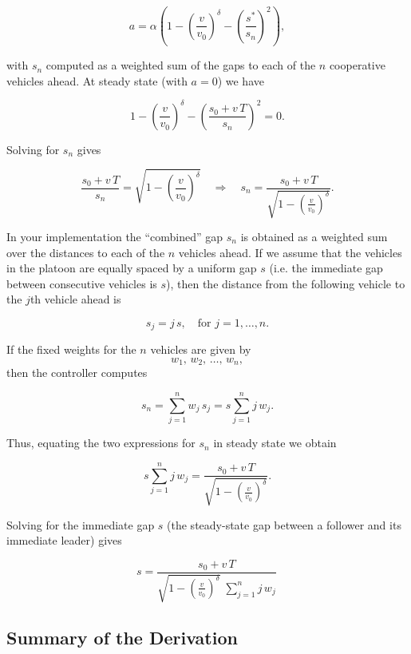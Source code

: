 \documentclass{article}
\begin{document}
\[
a = \alpha\left(1 - \left(\frac{v}{v_0}\right)^\delta - \left(\frac{s^*}{s_n}\right)^2\right),
\]

with \(s_n\) computed as a weighted sum of the gaps to each of the \(n\) cooperative vehicles ahead. At steady state (with \(a=0\)) we have

\[
1 - \left(\frac{v}{v_0}\right)^\delta - \left(\frac{s_0+v\,T}{s_n}\right)^2 = 0.
\]

Solving for \(s_n\) gives

\[
\frac{s_0+v\,T}{s_n} = \sqrt{1 - \left(\frac{v}{v_0}\right)^\delta}
\quad\Longrightarrow\quad
s_n = \frac{s_0+v\,T}{\sqrt{1 - \left(\frac{v}{v_0}\right)^\delta}}.
\]

In your implementation the ``combined'' gap \(s_n\) is obtained as a weighted sum over the distances to each of the \(n\) vehicles ahead. If we assume that the vehicles in the platoon are equally spaced by a uniform gap \(s\) (i.e. the immediate gap between consecutive vehicles is \(s\)), then the distance from the following vehicle to the \(j\)th vehicle ahead is

\[
s_j = j\,s,\quad \text{for } j=1,\ldots,n.
\]

If the fixed weights for the \(n\) vehicles are given by
\[
w_1,\,w_2,\,\dots,\,w_n,
\]
then the controller computes

\[
s_n = \sum_{j=1}^{n} w_j\, s_j = s \sum_{j=1}^{n} j\, w_j.
\]

Thus, equating the two expressions for \(s_n\) in steady state we obtain

\[
s \sum_{j=1}^{n} j\, w_j = \frac{s_0+v\,T}{\sqrt{1 - \left(\frac{v}{v_0}\right)^\delta}}.
\]

Solving for the immediate gap \(s\) (the steady-state gap between a follower and its immediate leader) gives

\[
\boxed{s = \frac{s_0+v\,T}{\sqrt{1 - \left(\frac{v}{v_0}\right)^\delta}\;\displaystyle\sum_{j=1}^{n} j\,w_j}\,}
\]

\subsection*{Summary of the Derivation}
\end{document}
